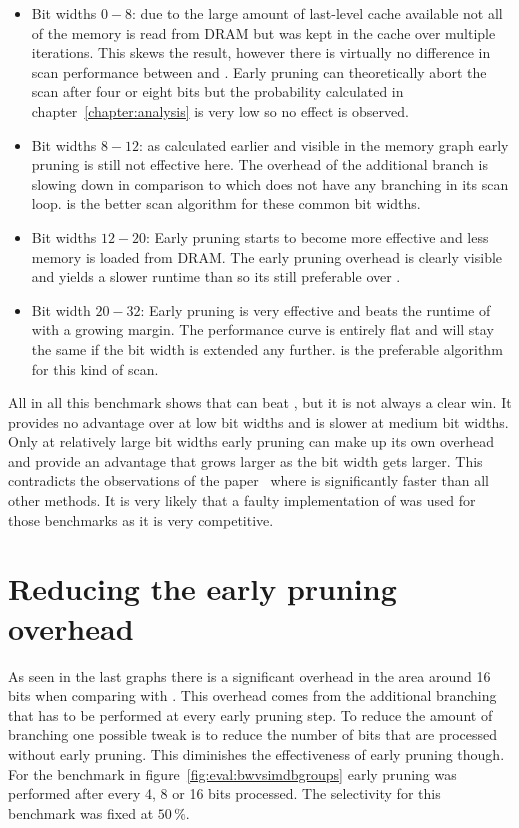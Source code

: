 \begin{itemize}
  \item Bit widths $0-8$: due to the large amount of last-level cache
  available not all of the memory is read from DRAM but was kept in the cache
  over multiple iterations. This skews the result, however there is virtually
  no difference in scan performance between \simdscan{} and \bwv{}. Early
  pruning can theoretically abort the scan after four or eight bits but the
  probability calculated in chapter~\ref{chapter:analysis} is very low so no
  effect is observed.
  \item Bit widths $8-12$: as calculated earlier and visible in the memory
  graph early pruning is still not effective here. The overhead of the additional
  branch is slowing down \bwv{} in comparison to \simdscan{} which does not have
  any branching in its scan loop. \simdscan{} is the better scan algorithm for
  these common bit widths.
  \item Bit widths $12-20$: Early pruning starts to become more effective and
  less memory is loaded from DRAM. The early pruning overhead is clearly
  visible and yields a slower runtime than \simdscan{} so its still preferable
  over \bwv{}.
  \item Bit width $20-32$: Early pruning is very effective and beats the
  runtime of \simdscan{} with a growing margin. The performance curve is
  entirely flat and will stay the same if the bit width is extended any further.
  \bwv{} is the preferable algorithm for this kind of scan.
\end{itemize}

All in all this benchmark shows that \bwv{} can beat \simdscan{}, but it is not
always a clear win. It provides no advantage over \simdscan{} at low bit widths
and is slower at medium bit widths. Only at relatively large bit widths early
pruning can make up its own overhead and provide an advantage that grows larger
as the bit width gets larger. This contradicts the observations of the
\bwv{} paper~\cite{BitWeaving} where \bwv{} is significantly faster than all
other methods. It is very likely that a faulty implementation of \simdscan{} was
used for those benchmarks as it is very competitive.

\section{Reducing the early pruning overhead}

As seen in the last graphs there is a significant overhead in the area around
16 bits when comparing \bwv{} with \simdscan{}. This overhead comes from the
additional branching that has to be performed at every early pruning step. To
reduce the amount of branching one possible tweak is to reduce the number of
bits that are processed without early pruning. This diminishes the
effectiveness of early pruning though. For the benchmark in
figure~\ref{fig:eval:bwvsimdbgroups} early pruning was performed after every 4,
8 or 16 bits processed. The selectivity for this benchmark was fixed at $50\,\%$.

